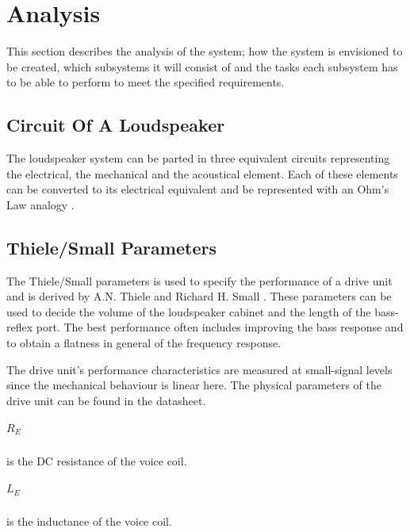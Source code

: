 
\chapter{Analysis}
This section describes the analysis of the system; how the system is envisioned to be created, which subsystems it will consist of and the tasks each subsystem has to be able to perform to meet the specified requirements.

\section{Circuit Of A Loudspeaker}
The loudspeaker system can be parted in three equivalent circuits representing the electrical, the mechanical and the acoustical element. Each of these elements can be converted to its electrical equivalent and be represented with an Ohm's Law analogy \cite[p.~115]{Elektroakustik}.


\section{Thiele/Small Parameters}
The Thiele/Small parameters is used to specify the performance of a drive unit and is derived by A.N. Thiele \cite{thiele1971loudspeakers} and Richard H. Small \cite{small1972closed}.
These parameters can be used to decide the volume of the loudspeaker cabinet and the length of the bass-reflex port. The best performance often includes improving the bass response and to obtain a flatness in general of the frequency response.

The drive unit's performance characteristics are measured at small-signal levels since the mechanical behaviour is linear here.  
The physical parameters of the drive unit can be found in the datasheet.


\paragraph{$R_E$} is the DC resistance of the voice coil.

\paragraph{$L_E$} is the inductance of the voice coil.

